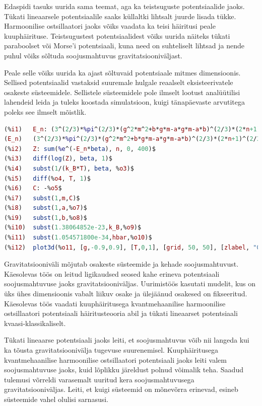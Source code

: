 \documentclass{trkut}%
\begin{document}
Edaspidi tasuks uurida sama teemat, aga ka teistsuguste potentsiaalide jaoks.
Tükati lineaarsele potentsiaalile saaks küllaltki lihtsalt juurde lisada tükke.
Harmoonilise ostsillaatori jaoks võiks vaadata ka teisi häiritusi peale kuuphäirituse.
Teistsugustest potentsiaalidest võiks uurida näiteks tükati paraboolset või Morse'i potentsiaali, kuna need on suhteliselt lihtsad ja nende puhul võiks sõltuda soojusmahtuvus gravitatsiooniväljast.

Peale selle võiks uurida ka ajast sõltuvaid potentsiaale mitmes dimensioonis.
Sellised potentsiaalid vastaksid suuremale hulgale reaalselt eksisteerivatele osakeste süsteemidele.
Sellistele süsteemidele pole ilmselt lootust analüütilisi lahendeid leida ja tuleks koostada simulatsioon, kuigi tänapäevaste arvutitega poleks see ilmselt mõistlik.



\printbibliography
{} \label{maximalisa}
\begin{lstlisting}[language=Maxima, breaklines=true]
(%i1)	E_n: (3^(2/3)*%pi^(2/3)*(g^2*m^2+b*g*m-a*g*m-a*b)^(2/3)*(2*n+1)^(2/3)*hbar^(2/3))/(2^(5/3)*(b+a)^(2/3)*m^(1/3));
(E_n)	(3^(2/3)*%pi^(2/3)*(g^2*m^2+b*g*m-a*g*m-a*b)^(2/3)*(2*n+1)^(2/3)*hbar^(2/3))/(2^(5/3)*(b+a)^(2/3)*m^(1/3))
(%i2)	Z: sum(%e^(-E_n*beta), n, 0, 400)$
(%i3)	diff(log(Z), beta, 1)$
(%i4)	subst(1/(k_B*T), beta, %o3)$
(%i5)	diff(%o4, T, 1)$
(%i6)	C: -%o5$
(%i7)	subst(1,m,C)$
(%i8)	subst(1,a,%o7)$
(%i9)	subst(1,b,%o8)$
(%i10)	subst(1.38064852e-23,k_B,%o9)$
(%i11)	subst(1.054571800e-34,hbar,%o10)$
(%i12)	plot3d(%o11, [g,-0.9,0.9], [T,0,1], [grid, 50, 50], [zlabel, "C"], [gnuplot_pm3d,true]);
\end{lstlisting}

Gravitatsiooniväli mõjutab osakeste süsteemide ja kehade soojusmahtuvust.
Käesolevas töös on leitud ligikaudsed seosed kahe erineva potentsiaali soojusmahtuvuse jaoks gravitatsiooniväljas.
Uurimistöös kasutati mudelit, kus on üks ühes dimensioonis vabalt liikuv osake ja ülejäänud osakesed on fikseeritud.
Käesolevas töös vaadati kuuphäiritusega kvantmehaanilise harmoonilise ostsillaatori potentsiaali häiritusteooria abil ja tükati lineaarset potentsiaali kvaasi-klassikaliselt.

Tükati lineaarse potentsiaali jaoks leiti, et soojusmahtuvus võib nii langeda kui ka tõusta gravitatsioonivälja tugevuse suurenemisel.
Kuuphäiritusega kvantmehaanilise harmoonilise ostsillaatori potentsiaali jaoks leiti valem soojusmahtuvuse jaoks, kuid lõplikku järeldust polnud võimalik teha.
Saadud tulemusi võrreldi varasemalt uuritud kera soojusmahtuvusega gravitatsiooniväljas.
Leiti, et kuigi süsteemid on mõnevõrra erinevad, esineb süsteemide vahel olulisi sarnasusi.
\end{document}

